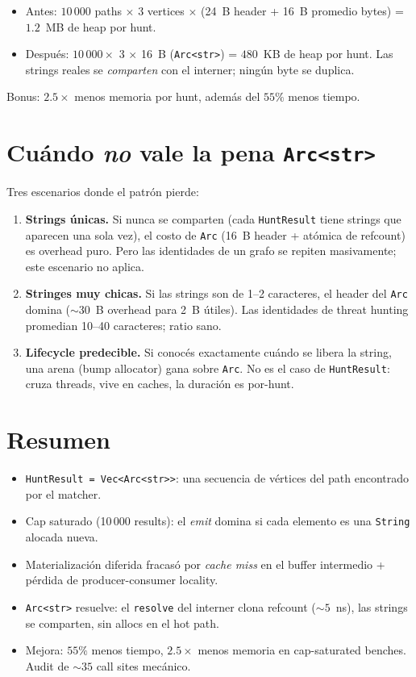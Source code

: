 \begin{itemize}
    \item Antes: \(10\,000\) paths \(\times\) 3 vertices \(\times\)
    (24~B header + 16~B promedio bytes) = \(1.2\)~MB de heap por
    hunt.
    \item Después: \(10\,000 \times\) 3 \(\times\) 16~B (\texttt{Arc<str>})
    = \(480\)~KB de heap por hunt. Las strings reales se
    \emph{comparten} con el interner; ningún byte se duplica.
\end{itemize}

\noindent
Bonus: \(2.5\times\) menos memoria por hunt, además del \(55\%\)
menos tiempo.

\section{Cuándo \emph{no} vale la pena \texttt{Arc<str>}}

Tres escenarios donde el patrón pierde:

\begin{enumerate}
    \item \textbf{Strings únicas.} Si nunca se comparten
    (cada \texttt{HuntResult} tiene strings que aparecen una sola
    vez), el costo de \texttt{Arc} (16~B header + atómica de
    refcount) es overhead puro. Pero las identidades de un grafo se
    repiten masivamente; este escenario no aplica.
    \item \textbf{Stringes muy chicas.} Si las strings son de 1--2
    caracteres, el header del \texttt{Arc} domina ($\sim$30~B
    overhead para 2~B útiles). Las identidades de threat hunting
    promedian 10--40 caracteres; ratio sano.
    \item \textbf{Lifecycle predecible.} Si conocés exactamente
    cuándo se libera la string, una arena (bump allocator) gana
    sobre \texttt{Arc}. No es el caso de \texttt{HuntResult}: cruza
    threads, vive en caches, la duración es por-hunt.
\end{enumerate}

\section{Resumen}

\begin{itemize}
    \item \texttt{HuntResult = Vec<Arc<str>>}: una secuencia de
    vértices del path encontrado por el matcher.
    \item Cap saturado (10\,000 results): el \emph{emit} domina si
    cada elemento es una \texttt{String} alocada nueva.
    \item Materialización diferida fracasó por \emph{cache miss}
    en el buffer intermedio + pérdida de producer-consumer locality.
    \item \texttt{Arc<str>} resuelve: el \texttt{resolve} del
    interner clona refcount (\(\sim 5\)~ns), las strings se
    comparten, sin allocs en el hot path.
    \item Mejora: \(55\%\) menos tiempo, \(2.5\times\) menos memoria
    en cap-saturated benches. Audit de $\sim 35$ call sites
    mecánico.
\end{itemize}

